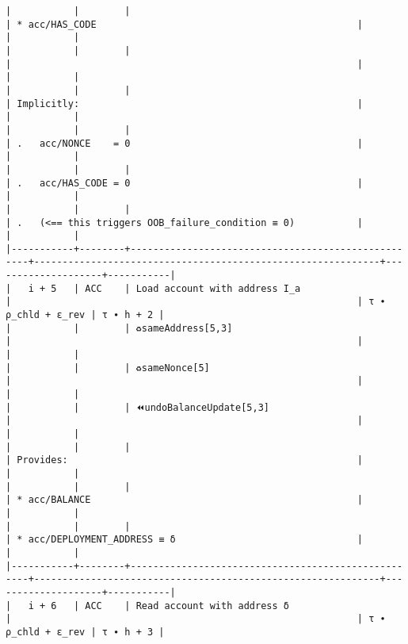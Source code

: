 \documentclass[varwidth=\maxdimen,margin=0.5cm,multi={verbatim}]{standalone}
\begin{document}
\begin{verbatim}
|           |        |                                                    | * acc/HAS_CODE                                              |                    |           |
|           |        |                                                    |                                                             |                    |           |
|           |        |                                                    | Implicitly:                                                 |                    |           |
|           |        |                                                    | .   acc/NONCE    = 0                                        |                    |           |
|           |        |                                                    | .   acc/HAS_CODE = 0                                        |                    |           |
|           |        |                                                    | .   (<== this triggers OOB_failure_condition ≡ 0)           |                    |           |
|-----------+--------+----------------------------------------------------+-------------------------------------------------------------+--------------------+-----------|
|   i + 5   | ACC    | Load account with address I_a                      |                                                             | τ ∙ ρ_chld + ε_rev | τ ∙ h + 2 |
|           |        | ♻️sameAddress[5,3]                                 |                                                             |                    |           |
|           |        | ♻️sameNonce[5]                                     |                                                             |                    |           |
|           |        | ⏪undoBalanceUpdate[5,3]                           |                                                             |                    |           |
|           |        |                                                    | Provides:                                                   |                    |           |
|           |        |                                                    | * acc/BALANCE                                               |                    |           |
|           |        |                                                    | * acc/DEPLOYMENT_ADDRESS ≡ δ                                |                    |           |
|-----------+--------+----------------------------------------------------+-------------------------------------------------------------+--------------------+-----------|
|   i + 6   | ACC    | Read account with address δ                        |                                                             | τ ∙ ρ_chld + ε_rev | τ ∙ h + 3 |

\end{verbatim}
\end{document}

